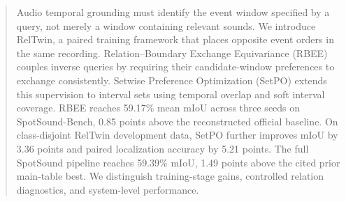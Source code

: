 \begin{abstract}
Audio temporal grounding must identify the event window specified by a query, not merely a window containing relevant sounds. We introduce RelTwin, a paired training framework that places opposite event orders in the same recording. Relation--Boundary Exchange Equivariance (RBEE) couples inverse queries by requiring their candidate-window preferences to exchange consistently. Setwise Preference Optimization (SetPO) extends this supervision to interval sets using temporal overlap and soft interval coverage. RBEE reaches 59.17\% mean mIoU across three seeds on SpotSound-Bench, 0.85 points above the reconstructed official baseline. On class-disjoint RelTwin development data, SetPO further improves mIoU by 3.36 points and paired localization accuracy by 5.21 points. The full SpotSound pipeline reaches 59.39\% mIoU, 1.49 points above the cited prior main-table best. We distinguish training-stage gains, controlled relation diagnostics, and system-level performance.
\end{abstract}
